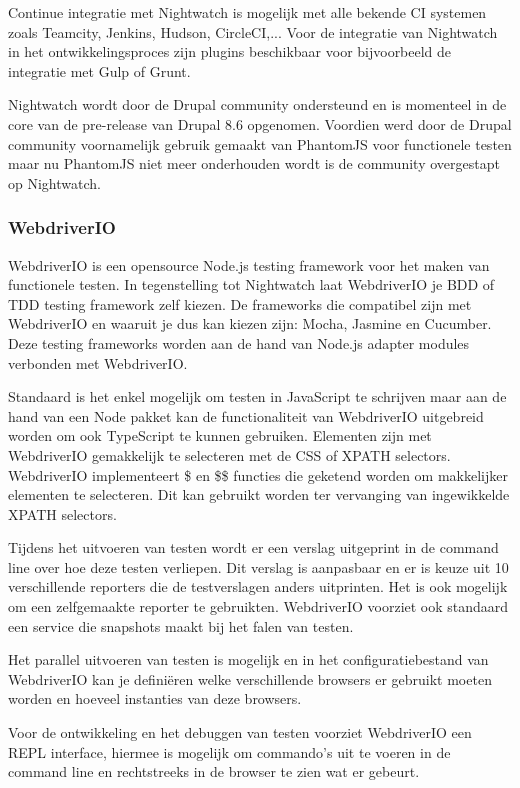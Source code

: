 Continue integratie met Nightwatch is mogelijk met alle bekende CI systemen zoals Teamcity, Jenkins, Hudson, CircleCI,... Voor de integratie van Nightwatch in het ontwikkelingsproces zijn plugins beschikbaar voor bijvoorbeeld de integratie met Gulp of Grunt.

Nightwatch wordt door de Drupal community ondersteund en is momenteel in de core van de pre-release van Drupal 8.6 opgenomen. Voordien werd door de Drupal community voornamelijk gebruik gemaakt van PhantomJS voor functionele testen maar nu PhantomJS niet meer onderhouden wordt is de community overgestapt op Nightwatch.

\subsubsection{WebdriverIO}
WebdriverIO is een opensource Node.js testing framework voor het maken van functionele testen. In tegenstelling tot Nightwatch laat WebdriverIO je BDD of TDD testing framework zelf kiezen. De frameworks die compatibel zijn met WebdriverIO en waaruit je dus kan kiezen zijn: Mocha, Jasmine en Cucumber. Deze testing frameworks worden aan de hand van Node.js adapter modules verbonden met WebdriverIO.

Standaard is het enkel mogelijk om testen in JavaScript te schrijven maar aan de hand van een Node pakket kan de functionaliteit van WebdriverIO uitgebreid worden om ook TypeScript te kunnen gebruiken. Elementen zijn met WebdriverIO gemakkelijk te selecteren met de CSS of XPATH selectors. WebdriverIO implementeert \$ en \$\$ functies die geketend worden om makkelijker elementen te selecteren. Dit kan gebruikt worden ter vervanging van ingewikkelde XPATH selectors.

Tijdens het uitvoeren van testen wordt er een verslag uitgeprint in de command line  over hoe deze testen verliepen. Dit verslag is aanpasbaar en er is keuze uit 10 verschillende reporters die de testverslagen anders uitprinten. Het is ook mogelijk om een zelfgemaakte reporter te gebruikten. WebdriverIO voorziet ook standaard een service die snapshots maakt bij het falen van testen.

Het parallel uitvoeren van testen is mogelijk en in het configuratiebestand van WebdriverIO kan je definiëren welke verschillende browsers er gebruikt moeten worden en hoeveel instanties van deze browsers.

Voor de ontwikkeling en het debuggen van testen voorziet WebdriverIO een REPL interface, hiermee is mogelijk om commando's uit te voeren in de command line en rechtstreeks in de browser te zien wat er gebeurt.


